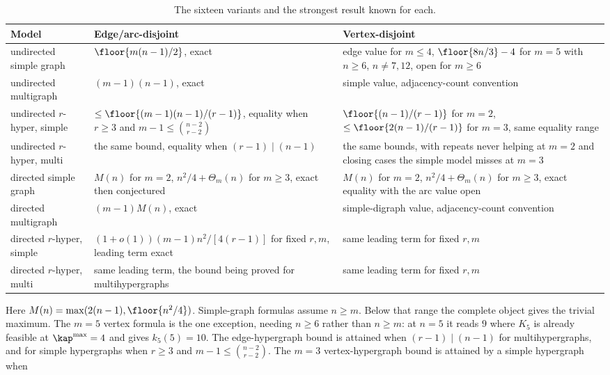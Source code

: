 \begin{table}[htbp]
\centering
\renewcommand{\arraystretch}{1.06}
\setlength{\tabcolsep}{4pt}
\begin{tabularx}{\textwidth}{@{}>{\raggedright\arraybackslash}p{}XX@{}}
\toprule
Model & Edge/arc-disjoint & Vertex-disjoint \\
\midrule
undirected simple graph
  & $\floor{m(n-1)/2}$, exact
  & edge value for $m\le4$, $\floor{8n/3}-4$ for $m=5$ with $n\ge6$, $n\ne7,12$, open for $m\ge6$ \\
undirected multigraph
  & $(m-1)(n-1)$, exact
  & simple value, adjacency-count convention \\
undirected $r$-hyper, simple
  & $\le\floor{(m-1)(n-1)/(r-1)}$, equality when $r\ge3$ and $m-1\le\binom{n-2}{r-2}$
  & $\floor{(n-1)/(r-1)}$ for $m=2$, $\le\floor{2(n-1)/(r-1)}$ for $m=3$, same equality range \\
undirected $r$-hyper, multi
  & the same bound, equality when $(r-1)\mid(n-1)$
  & the same bounds, with repeats never helping at $m=2$ and closing cases the simple model misses at $m=3$ \\
directed simple graph
  & $M(n)$ for $m=2$, $n^2/4+\Theta_m(n)$ for $m\ge3$, exact then conjectured
  & $M(n)$ for $m=2$, $n^2/4+\Theta_m(n)$ for $m\ge3$, exact equality with the arc value open \\
directed multigraph
  & $(m-1)M(n)$, exact
  & simple-digraph value, adjacency-count convention \\
directed $r$-hyper, simple
  & $(1+o(1))(m-1)n^2/[4(r-1)]$ for fixed $r,m$, leading term exact
  & same leading term for fixed $r,m$ \\
directed $r$-hyper, multi
  & same leading term, the bound being proved for multihypergraphs
  & same leading term for fixed $r,m$ \\
\bottomrule
\end{tabularx}
\caption{The sixteen variants and the strongest result known for each.}
\label{tab:summary}%
\end{table}%
Here $M(n)=\max(2(n-1),\floor{n^2/4})$. Simple-graph formulas assume
$n\ge m$. Below that range the complete object gives the trivial maximum.
The $m=5$ vertex formula is the one exception, needing $n\ge6$ rather than
$n\ge m$: at $n=5$ it reads $9$ where $K_5$ is already feasible at
$\kap^{\max}=4$ and gives $k_5(5)=10$.
The edge-hypergraph bound is attained when $(r-1)\mid(n-1)$ for
multihypergraphs, and for simple hypergraphs when $r\ge3$ and
$m-1\le\binom{n-2}{r-2}$. The $m=3$ vertex-hypergraph bound is attained by a simple hypergraph when
